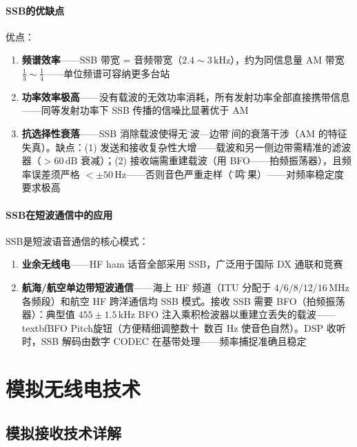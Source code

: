 \documentclass[12pt,UTF8]{ctexbook}
\begin{document}
\subsection{SSB的优缺点}

优点：
\begin{enumerate}
\item \textbf{频谱效率}——SSB 带宽 = 音频带宽（$2.4\sim3\,\mathrm{kHz}$），约为同信息量 AM 带宽 $\frac13\sim\frac14$——单位频谱可容纳更多台站
\item \textbf{功率效率极高}——没有载波的无效功率消耗，所有发射功率全部直接携带信息——同等发射功率下 SSB 传播的信噪比显著优于 AM
\item \textbf{抗选择性衰落}——SSB 消除载波使得无\"载波—边带\"之间的衰落干涉（AM 的特征失真）。缺点：(1) 发送和接收复杂性大增——载波和另一侧边带需精准的滤波器（$>60\,\mathrm{dB}$ 衰减）；(2) 接收端需重建载波（用 BFO——拍频振荡器），且频率误差须严格 $<\pm50\,\mathrm{Hz}$——否则音色严重走样（\"牛鸣\"效果）——对频率稳定度要求极高
\end{enumerate}

\subsection{SSB在短波通信中的应用}

SSB是短波语音通信的核心模式：
\begin{enumerate}
\item \textbf{业余无线电}——HF ham 话音全部采用 SSB，广泛用于国际 DX 通联和竞赛
\item \textbf{航海/航空单边带短波通信}——海上 HF 频道（ITU 分配于 $4/6/8/12/16\,\mathrm{MHz}$ 各频段）和航空 HF 跨洋通信均 SSB 模式。接收 SSB 需要 BFO（拍频振荡器）：典型值 $455\pm1.5\,\mathrm{kHz}$ BFO 注入乘积检波器以重建立丢失的载波——\\textbf{BFO Pitch}旋钮（方便精细调整数十~数百 Hz 使音色自然）。DSP 收听时，SSB 解码由数字 CODEC 在基带处理——频率捕捉准确且稳定
\end{enumerate}


\part{模拟无线电技术}

\chapter{模拟接收技术详解}
\label{chap:analog_rx}
\end{document}
